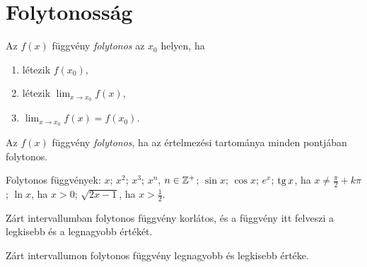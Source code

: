 \documentclass[11pt]{article}
\begin{document}
\section{Folytonosság}

\begin{defbox}
\begin{definition}
Az $f(x)$ függvény \emph{folytonos} az $x_{0}$ helyen, ha
\begin{enumerate}[label=\arabic*.]
\item létezik $f(x_{0})$,
\item létezik $\displaystyle\lim_{x\to x_{0}}f(x)$,
\item $\displaystyle\lim_{x\to x_{0}}f(x)=f(x_{0})$.
\end{enumerate}
\end{definition}
\end{defbox}

\begin{defbox}
\begin{definition}
Az $f(x)$ függvény \emph{folytonos}, ha az értelmezési tartománya minden pontjában folytonos.
\end{definition}
\end{defbox}

\begin{exbox}
\begin{example}
Folytonos függvények: $x$; $x^{2}$; $x^{3}$; $x^{n}$, $n\in\mathbb{Z}^{+}$; $\sin x$; $\cos x$; $e^{x}$; $\operatorname{tg} x$, ha $x\neq\frac{\pi}{2}+k\pi$; $\ln x$, ha $x>0$; $\sqrt{2x-1}$, ha $x>\frac{1}{2}$.
\end{example}
\end{exbox}

\begin{thmbox}
\begin{theorem}[Weierstrass]
Zárt intervallumban folytonos függvény korlátos, és a függvény itt felveszi a legkisebb és a legnagyobb értékét.
\end{theorem}
\end{thmbox}

\begin{notefig}{Zárt intervallumon folytonos függvény legnagyobb és legkisebb értéke.}
\end{notefig}
\end{document}
